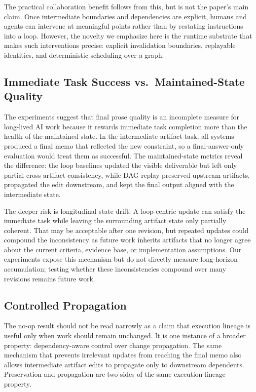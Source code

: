 \documentclass{article}
\begin{document}
The practical collaboration benefit follows from this, but is not the paper's main claim. Once intermediate boundaries and dependencies are explicit, humans and agents can intervene at meaningful points rather than by restating instructions into a loop. However, the novelty we emphasize here is the runtime substrate that makes such interventions precise: explicit invalidation boundaries, replayable identities, and deterministic scheduling over a graph.

\subsection{Immediate Task Success vs.\ Maintained-State Quality}

The experiments suggest that final prose quality is an incomplete measure for long-lived AI work because it rewards immediate task completion more than the health of the maintained state. In the intermediate-artifact task, all systems produced a final memo that reflected the new constraint, so a final-answer-only evaluation would treat them as successful. The maintained-state metrics reveal the difference: the loop baselines updated the visible deliverable but left only partial cross-artifact consistency, while DAG replay preserved upstream artifacts, propagated the edit downstream, and kept the final output aligned with the intermediate state.

The deeper risk is longitudinal state drift. A loop-centric update can satisfy the immediate task while leaving the surrounding artifact state only partially coherent. That may be acceptable after one revision, but repeated updates could compound the inconsistency as future work inherits artifacts that no longer agree about the current criteria, evidence base, or implementation assumptions. Our experiments expose this mechanism but do not directly measure long-horizon accumulation; testing whether these inconsistencies compound over many revisions remains future work.

\subsection{Controlled Propagation}

The no-op result should not be read narrowly as a claim that execution lineage is useful only when work should remain unchanged. It is one instance of a broader property: dependency-aware control over change propagation. The same mechanism that prevents irrelevant updates from reaching the final memo also allows intermediate artifact edits to propagate only to downstream dependents. Preservation and propagation are two sides of the same execution-lineage property.
\end{document}
